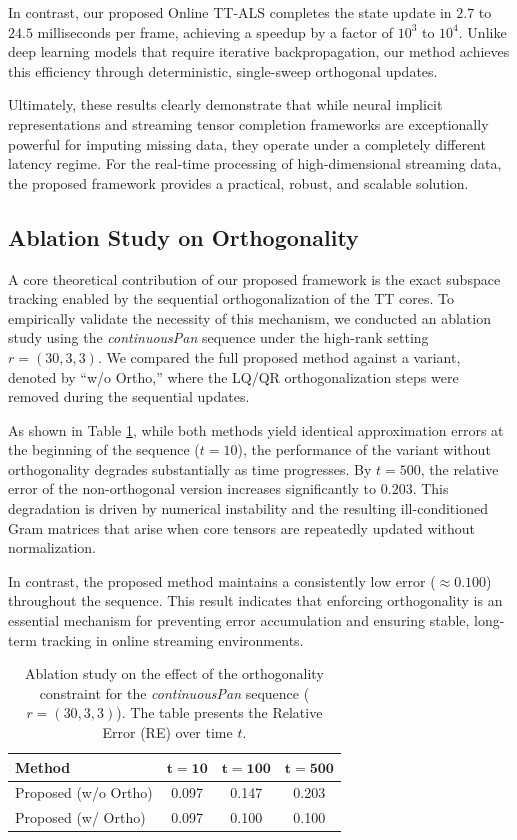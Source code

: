 \documentclass[a4paper, 11pt]{article}
\theoremstyle{plain}
\theoremstyle{definition}
\theoremstyle{remark}
\begin{document}
In contrast, our proposed Online TT-ALS completes the state update in $2.7$ to $24.5$ milliseconds per frame, achieving a speedup by a factor of $10^3$ to $10^4$.
Unlike deep learning models that require iterative backpropagation, our method achieves this efficiency through deterministic, single-sweep orthogonal updates.

Ultimately, these results clearly demonstrate that while neural implicit representations and streaming tensor completion frameworks are exceptionally powerful for imputing missing data, they operate under a completely different latency regime.
For the real-time processing of high-dimensional streaming data, the proposed framework provides a practical, robust, and scalable solution.

\subsection{Ablation Study on Orthogonality}
A core theoretical contribution of our proposed framework is the exact subspace tracking enabled by the sequential orthogonalization of the TT cores.
To empirically validate the necessity of this mechanism, we conducted an ablation study using the \textit{continuousPan} sequence under the high-rank setting $r=(30, 3, 3)$.
We compared the full proposed method against a variant, denoted by ``w/o Ortho,'' where the LQ/QR orthogonalization steps were removed during the sequential updates.

As shown in Table \ref{tab:ablation_ortho}, while both methods yield identical approximation errors at the beginning of the sequence ($t=10$), the performance of the variant without orthogonality degrades substantially as time progresses.
By $t=500$, the relative error of the non-orthogonal version increases significantly to $0.203$.
This degradation is driven by numerical instability and the resulting ill-conditioned Gram matrices that arise when core tensors are repeatedly updated without normalization. 

In contrast, the proposed method maintains a consistently low error ($\approx 0.100$) throughout the sequence.
This result indicates that enforcing orthogonality is an essential mechanism for preventing error accumulation and ensuring stable, long-term tracking in online streaming environments.

\begin{table}[t]
    \centering
    \caption{Ablation study on the effect of the orthogonality constraint for the \textit{continuousPan} sequence ($r=(30,3,3)$). The table presents the Relative Error (RE) over time $t$.}
    \label{tab:ablation_ortho}
        \begin{tabular}{l c c c}
            \toprule
            \textbf{Method} & $\mathbf{t=10}$ & $\mathbf{t=100}$ & $\mathbf{t=500}$ \\
            \midrule
            Proposed (w/o Ortho) & 0.097 & 0.147 & 0.203 \\
            Proposed (w/ Ortho) & 0.097 & 0.100 & 0.100 \\
            \bottomrule
        \end{tabular}
\end{table}
\end{document}
